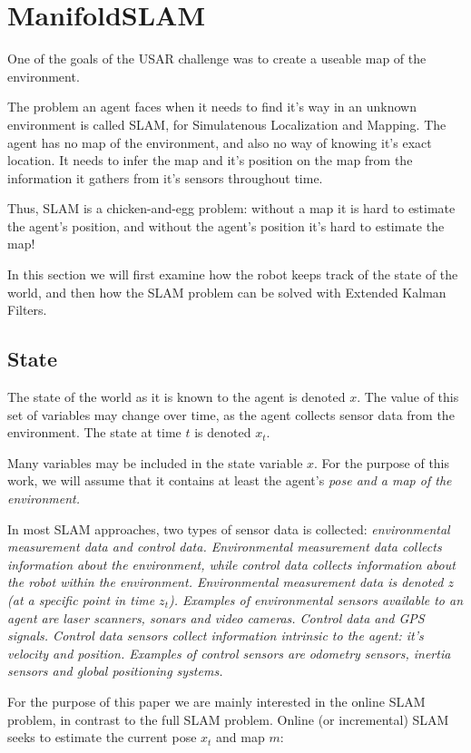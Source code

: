 \chapter{ManifoldSLAM}
One of the goals of the USAR challenge was to create a useable map of the environment. 

The problem an agent faces when it needs to find it's way in an unknown environment is called SLAM, for Simulatenous Localization and Mapping. The agent has no map of the environment, and also no way of knowing it's exact location. It needs to infer the map and it's position on the map from the information it gathers from it's sensors throughout time.

Thus, SLAM is a chicken-and-egg problem: without a map it is hard to estimate the agent's position, and without the agent's position it's hard to estimate the map!

In this section we will first examine how the robot keeps track of the state of the world, and then how the SLAM problem can be solved with Extended Kalman Filters. 

\section{State}
\label{slam:state}
The state of the world as it is known to the agent is denoted $x$. The value of this set of variables may change over time, as the agent collects sensor data from the environment. The state at time $t$ is denoted $x_{t}$. 

Many variables may be included in the state variable $x$. For the purpose of this work, we will assume that it contains at least the agent's \em{pose} and a \em{map of the environment}. 

In most SLAM approaches, two types of sensor data is collected: \em{environmental measurement data} and \em{control data}. Environmental measurement data collects information about the environment, while control data collects information about the robot within the environment. Environmental measurement data  is denoted $z$ (at a specific point in time $z_{t}$). Examples of environmental sensors available to an agent are laser scanners, sonars and video cameras. Control data and GPS signals. Control data sensors collect information intrinsic to the agent: it's velocity and position. Examples of control sensors are odometry sensors, inertia sensors and global positioning systems.

For the purpose of this paper we are mainly interested in the online SLAM problem, in contrast to the full SLAM problem. Online (or incremental) SLAM seeks to estimate the current pose $x_{t}$ and map $m$:

